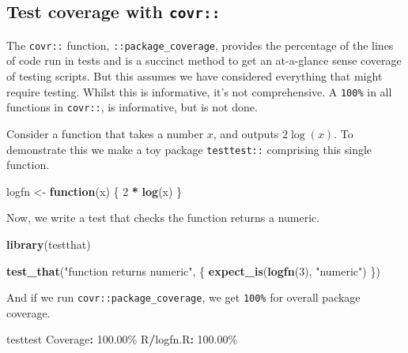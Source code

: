 \documentclass[
]{article}
\newenvironment{Shaded}{\begin{snugshade}}{\end{snugshade}}
\newcommand{\ControlFlowTok}[1]{\textcolor[rgb]{0.13,0.29,0.53}{\textbf{#1}}}
\newcommand{\DecValTok}[1]{\textcolor[rgb]{0.00,0.00,0.81}{#1}}
\newcommand{\FloatTok}[1]{\textcolor[rgb]{0.00,0.00,0.81}{#1}}
\newcommand{\KeywordTok}[1]{\textcolor[rgb]{0.13,0.29,0.53}{\textbf{#1}}}
\newcommand{\NormalTok}[1]{#1}
\newcommand{\OperatorTok}[1]{\textcolor[rgb]{0.81,0.36,0.00}{\textbf{#1}}}
\newcommand{\StringTok}[1]{\textcolor[rgb]{0.31,0.60,0.02}{#1}}
\begin{document}
\hypertarget{test-coverage-with-covr}{%
\subsection{\texorpdfstring{Test coverage with \texttt{covr::}}{Test coverage with covr::}}\label{test-coverage-with-covr}}

The \texttt{covr::} function, \texttt{::package\_coverage}, provides the percentage of the lines of code run in tests and is a succinct method to get an at-a-glance sense coverage of testing scripts. But this assumes we have considered everything that might require testing. Whilst this is informative, it's not comprehensive. A \texttt{100\%} in all functions in \texttt{covr::}, is informative, but is not done.

Consider a function that takes a number \(x\), and outputs \(2\log(x)\). To demonstrate this we make a toy package \texttt{testtest::} comprising this single function.

\begin{Shaded}
\begin{Highlighting}[]
\NormalTok{logfn <{-}}\StringTok{ }\ControlFlowTok{function}\NormalTok{(x) \{}
  \DecValTok{2} \OperatorTok{*}\StringTok{ }\KeywordTok{log}\NormalTok{(x)}
\NormalTok{\}}
\end{Highlighting}
\end{Shaded}

Now, we write a test that checks the function returns a numeric.

\begin{Shaded}
\begin{Highlighting}[]
\KeywordTok{library}\NormalTok{(testthat)}

\KeywordTok{test\_that}\NormalTok{(}\StringTok{"function returns numeric"}\NormalTok{, \{}
  \KeywordTok{expect\_is}\NormalTok{(}\KeywordTok{logfn}\NormalTok{(}\DecValTok{3}\NormalTok{), }\StringTok{"numeric"}\NormalTok{)}
\NormalTok{\})}
\end{Highlighting}
\end{Shaded}

And if we run \texttt{covr::package\_coverage}, we get \texttt{100\%} for overall package coverage.

\begin{Shaded}
\begin{Highlighting}[]
\NormalTok{testtest Coverage}\OperatorTok{:}\StringTok{ }\FloatTok{100.00}\NormalTok{\%}
\NormalTok{R}\OperatorTok{/}\NormalTok{logfn.R}\OperatorTok{:}\StringTok{ }\FloatTok{100.00}\NormalTok{\%}
\end{Highlighting}
\end{Shaded}
\end{document}
